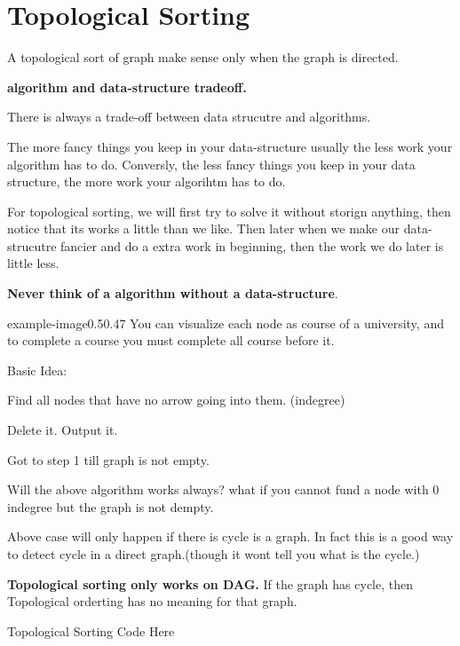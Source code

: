 \newpage
\section*{Topological Sorting}
A topological sort of graph make sense only when the graph is directed.

\begin{marginfigure}
    \raggedright
\textbf{algorithm and data-structure tradeoff.}

There is always a trade-off between data strucutre and algorithms.
\vspace*{2mm}

The more fancy things you keep in your data-structure usually the less work your algorithm has to do. Conversly, the less fancy things you keep in your data structure, the more work your algorihtm has to do.
\end{marginfigure}

 For topological sorting, we will first try to solve it without storign anything, then notice that its works a little than we like. Then later when we make our data-strucutre fancier and do a extra work in beginning, then the work we do later is little less.

\begin{marginfigure}
    \vspace{2mm}
    
    \raggedright
    \textbf{
        Never think of a algorithm without a data-structure}.
\end{marginfigure}

\vspace{5cm}
\begin{lfigure}{example-image}{0.5}{0.47}
    You can visualize each node as course of a university, and to complete a course you must complete all course before it.

    Basic Idea:
    \begin{compactenum}
        \item Find all nodes that have no arrow going into them. (indegree)
        \item Delete it. Output it.
        \item Got to step 1 till graph is not empty.
    \end{compactenum}
\end{lfigure}

Will the above algorithm works always? what if you cannot fund a node with 0 indegree but the graph is not dempty.

Above case will only happen if there is cycle is a graph. In fact this is a good way to detect cycle in a direct graph.(though it wont tell you what is the cycle.)

\textbf{Topological sorting only works on DAG.} If the graph has cycle, then Topological orderting has no meaning for that graph.

\medskip
\begin{code3}
    Topological Sorting Code Here
\end{code3}


